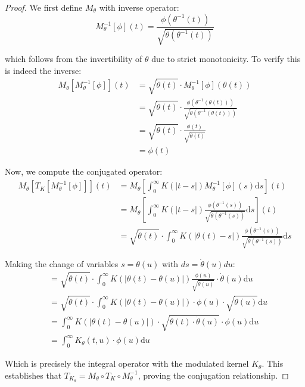 \documentclass{article}
\newcommand{\dd}{\mathrm{d}}
\newcommand{\dottheta}{\dot{\theta}}
\begin{document}
\begin{proof}
We first define $M_\theta$ with inverse operator:
\begin{equation}
M_\theta^{-1}[\phi](t) = \frac{\phi(\theta^{-1}(t))}{\sqrt{\dottheta(\theta^{-1}(t))}}
\end{equation}

which follows from the invertibility of $\theta$ due to strict monotonicity. To verify this is indeed the inverse:
\begin{align}
M_\theta[M_\theta^{-1}[\phi]](t) &= \sqrt{\dottheta(t)} \cdot M_\theta^{-1}[\phi](\theta(t))\\
&= \sqrt{\dottheta(t)} \cdot \frac{\phi(\theta^{-1}(\theta(t)))}{\sqrt{\dottheta(\theta^{-1}(\theta(t)))}}\\
&= \sqrt{\dottheta(t)} \cdot \frac{\phi(t)}{\sqrt{\dottheta(t)}}\\
&= \phi(t)
\end{align}

Now, we compute the conjugated operator:
\begin{align}
M_\theta[T_K[M_\theta^{-1}[\phi]]](t) &= M_\theta[\int_0^\infty K(|t-s|)M_\theta^{-1}[\phi](s) \dd s](t)\\
&= M_\theta[\int_0^\infty K(|t-s|)\frac{\phi(\theta^{-1}(s))}{\sqrt{\dottheta(\theta^{-1}(s))}} \dd s](t)\\
&= \sqrt{\dottheta(t)} \cdot \int_0^\infty K(|\theta(t)-s|)\frac{\phi(\theta^{-1}(s))}{\sqrt{\dottheta(\theta^{-1}(s))}} \dd s
\end{align}

Making the change of variables $s = \theta(u)$ with $ds = \dottheta(u)du$:
\begin{align}
&= \sqrt{\dottheta(t)} \cdot \int_0^\infty K(|\theta(t)-\theta(u)|)\frac{\phi(u)}{\sqrt{\dottheta(u)}} \cdot \dottheta(u) \dd u\\
&= \sqrt{\dottheta(t)} \cdot \int_0^\infty K(|\theta(t)-\theta(u)|) \cdot \phi(u) \cdot \sqrt{\dottheta(u)} \dd u\\
&= \int_0^\infty K(|\theta(t)-\theta(u)|) \cdot \sqrt{\dottheta(t) \cdot \dottheta(u)} \cdot \phi(u) \dd u\\
&= \int_0^\infty K_\theta(t,u) \cdot \phi(u) \dd u
\end{align}

Which is precisely the integral operator with the modulated kernel $K_\theta$. This establishes that $T_{K_\theta} = M_\theta \circ T_K \circ M_\theta^{-1}$, proving the conjugation relationship.
\end{proof}
\end{document}
